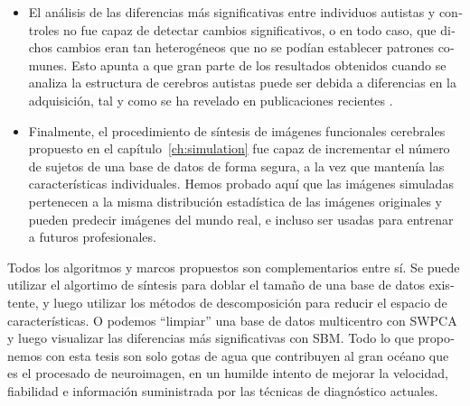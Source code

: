 \begin{otherlanguage}{spanish}
\begin{itemize}
	\item El análisis de las diferencias más significativas entre individuos autistas y controles no fue capaz de detectar cambios significativos, o en todo caso, que dichos cambios eran tan heterogéneos que no se podían establecer patrones comunes. Esto apunta a que gran parte de los resultados obtenidos cuando se analiza la estructura de cerebros autistas puede ser debida a diferencias en la adquisición, tal y como se ha revelado en publicaciones recientes \cite{haar2014anatomical}. 
	\item Finalmente, el procedimiento de síntesis de imágenes funcionales cerebrales propuesto en el capítulo~\ref{ch:simulation} fue capaz de incrementar el número de sujetos de una base de datos de forma segura, a la vez que mantenía las características individuales. Hemos probado aquí que las imágenes simuladas pertenecen a la misma distribución estadística de las imágenes originales y pueden predecir imágenes del mundo real, e incluso ser usadas para entrenar a futuros profesionales. 
\end{itemize}

Todos los algoritmos y marcos propuestos son complementarios entre sí. Se puede utilizar el algortimo de síntesis para doblar el tamaño de una base de datos existente, y luego utilizar los métodos de descomposición para reducir el espacio de características. O podemos ``limpiar'' una base de datos multicentro con \ac{SWPCA} y luego visualizar las diferencias más significativas con \ac{SBM}. Todo lo que proponemos con esta tesis son solo gotas de agua que contribuyen al gran océano que es el procesado de neuroimagen, en un humilde intento de mejorar la velocidad, fiabilidad e información suministrada por las técnicas de diagnóstico actuales. 
\end{otherlanguage}

\endgroup			

\vfill